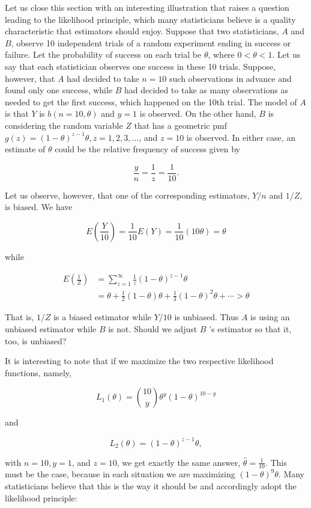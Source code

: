 Let us close this section with an interesting illustration that raises a question leading to the likelihood principle, which many statisticians believe is a quality characteristic that estimators should enjoy. Suppose that two statisticians, $A$ and $B$, observe 10 independent trials of a random experiment ending in success or failure. Let the probability of success on each trial be $\theta$, where $0<\theta<1$. Let us say that each statistician observes one success in these 10 trials. Suppose, however, that $A$ had decided to take $n=10$ such observations in advance and found only one success, while $B$ had decided to take as many observations as needed to get the first success, which happened on the 10th trial. The model of $A$ is that $Y$ is $b(n=10, \theta)$ and $y=1$ is observed. On the other hand, $B$ is considering the random variable $Z$ that has a geometric pmf $g(z)=(1-\theta)^{z-1} \theta, z=1,2,3, \ldots$, and $z=10$ is observed. In either case, an estimate of $\theta$ could be the relative frequency of success given by

$$
\frac{y}{n}=\frac{1}{z}=\frac{1}{10} .
$$

Let us observe, however, that one of the corresponding estimators, $Y / n$ and $1 / Z$, is biased. We have

$$
E\left(\frac{Y}{10}\right)=\frac{1}{10} E(Y)=\frac{1}{10}(10 \theta)=\theta
$$

while

$$
\begin{aligned}
E\left(\frac{1}{Z}\right) & =\sum_{z=1}^{\infty} \frac{1}{z}(1-\theta)^{z-1} \theta \\
& =\theta+\frac{1}{2}(1-\theta) \theta+\frac{1}{3}(1-\theta)^{2} \theta+\cdots>\theta
\end{aligned}
$$

That is, $1 / Z$ is a biased estimator while $Y / 10$ is unbiased. Thus $A$ is using an unbiased estimator while $B$ is not. Should we adjust $B$ 's estimator so that it, too, is unbiased?

It is interesting to note that if we maximize the two respective likelihood functions, namely,

$$
L_{1}(\theta)=\binom{10}{y} \theta^{y}(1-\theta)^{10-y}
$$

and

$$
L_{2}(\theta)=(1-\theta)^{z-1} \theta,
$$

with $n=10, y=1$, and $z=10$, we get exactly the same answer, $\hat{\theta}=\frac{1}{10}$. This must be the case, because in each situation we are maximizing $(1-\theta)^{9} \theta$. Many statisticians believe that this is the way it should be and accordingly adopt the likelihood principle:

